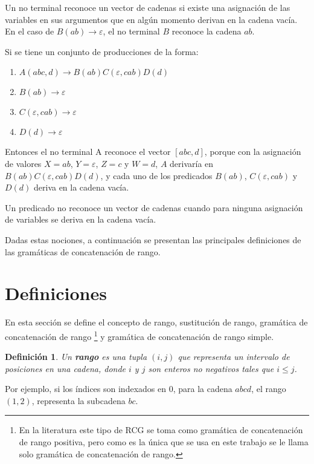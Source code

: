 \documentclass[12pt]{article}
\newtheorem{definition}{Definición}
\begin{document}
Un no terminal reconoce un vector de cadenas si existe una asignación de las variables 
en sus argumentos que en algún momento derivan en la cadena vacía. En el caso de $B(ab)\to \varepsilon$, 
el no terminal $B$ reconoce la cadena $ab$.

Si se tiene un conjunto de producciones de la forma:
\begin{enumerate}
    \item $A(abc,d)\to B(ab)C(\varepsilon,cab)D(d)$
    \item $B(ab)\to \varepsilon$
    \item $C(\varepsilon,cab)\to \varepsilon$
    \item $D(d)\to \varepsilon$
\end{enumerate}
Entonces el no terminal A reconoce el vector $[abc,d]$, porque con la asignación de valores $X=ab$, $Y=\varepsilon$, $Z=c$ y $W=d$, $A$ derivaría en $B(ab)C(\varepsilon,cab)D(d)$,
y cada uno de los predicados $B(ab)$, $C(\varepsilon,cab)$ y $D(d)$ deriva en la cadena vacía.

Un predicado no reconoce un vector de cadenas cuando para ninguna asignación de variables se deriva en la cadena vacía.

Dadas estas nociones, a continuación se presentan las principales definiciones de las gramáticas de concatenación de rango.

\section{Definiciones}

En esta sección se define el concepto de rango, sustitución de rango, gramática de concatenación de rango \footnote{En la literatura este tipo de RCG se toma como gramática de concatenación de rango positiva, pero como es la única que
    se usa en este trabajo se le llama solo gramática de concatenación de rango.} y gramática de concatenación de rango simple.

\begin{definition}
    Un \textbf{rango} es una tupla $(i, j)$ que representa un intervalo de posiciones en una cadena, donde $i$ y $j$ son enteros no negativos tales que $i \leq j$.    
\end{definition}

Por ejemplo, si los índices son indexados en 0, para la cadena $abcd$, el rango $(1,2)$, representa la subcadena $bc$.
\end{document}
